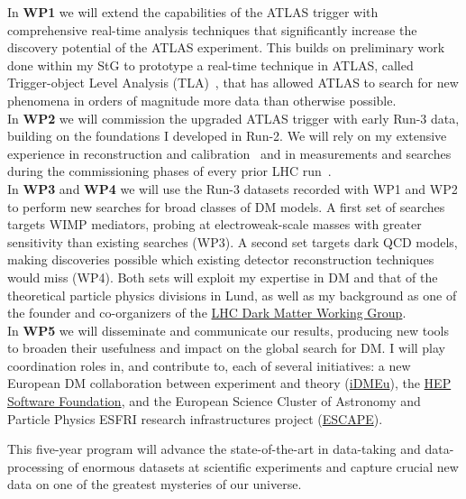 In \textbf{WP1} we will extend the capabilities of the ATLAS trigger with comprehensive real-time analysis techniques that significantly increase the discovery potential of the ATLAS experiment. This builds on preliminary work done within my StG to prototype a real-time technique in ATLAS, called Trigger-object Level Analysis (TLA)~\cite{Aaboud:2018fzt}, that has allowed ATLAS to search for new phenomena in orders of magnitude more data than otherwise possible. \\
In \textbf{WP2} we will commission the upgraded ATLAS trigger with early Run-3 data, building on the foundations I developed in Run-2. We will rely on my extensive experience in reconstruction and calibration~\cite{Aad:2014bia,Aaboud:2018kfi} and in measurements and searches during the commissioning phases of every prior LHC run~\cite{Doglioni:2011ema,Aad:2014aqa,ATLAS:2015nsi}. \\ %
In \textbf{WP3} and \textbf{WP4} we will use the Run-3 datasets recorded with WP1 and WP2 to perform new searches for broad classes of DM models. A first set of searches targets WIMP mediators, probing at electroweak-scale masses with greater sensitivity than existing searches (WP3). A second set targets dark QCD models, making discoveries possible which existing detector reconstruction techniques would miss (WP4). Both sets will exploit my expertise in DM and that of the theoretical particle physics divisions in Lund, as well as my background as one of the founder and co-organizers of the \href{https://lpcc.web.cern.ch/content/lhc-dm-wg-wg-dark-matter-searches-lhc}{LHC Dark Matter Working Group}. \\
In \textbf{WP5} we will disseminate and communicate our results, producing new tools to broaden their usefulness and impact on the global search for DM. I will play coordination roles in, and contribute to, each of several initiatives: a new European DM collaboration between experiment and theory (\href{https://indico.cern.ch/e/idmeu}{iDMEu}), the \href{https://hepsoftwarefoundation.org}{HEP Software Foundation}, and the European Science Cluster of Astronomy and Particle Physics ESFRI research infrastructures project (\href{https://projectescape.eu}{ESCAPE}). 

This five-year program will advance the state-of-the-art in data-taking and data-processing of enormous datasets at scientific experiments and capture crucial new data on one of the greatest mysteries of our universe. 
